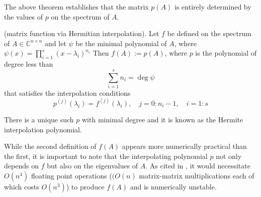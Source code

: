 The above theorem establishes that the matrix $p(A)$ is entirely determined by the values of $p$ on the spectrum of $A$.

\begin{definition}
    \label{def:2.5}
    \cite{8}(matrix function via Hermitian interpolation). Let $f$ be defined on the spectrum of $A \in \mathbb{C}^{n \times n}$ and let $\psi$ be the minimal polynomial of $A$, where $\psi(x)=\prod^{s}_{i=1}(x-\lambda_{i})^{n_{i}}$ Then $f(A) := p(A)$, where $p$ is the polynomial of degree less than
    \[
        \sum_{i=1}^{s} n_i = \deg \psi
    \]
    that satisfies the interpolation conditions
    \begin{equation}
        p^{(j)}(\lambda_i) = f^{(j)}(\lambda_i), \quad j=0:n_i-1, \quad i=1:s
        \label{eq:2.5}
    \end{equation}

    There is a unique such $p$ with minimal degree and it is known as the Hermite interpolation polynomial.
\end{definition}

While the second definition of $f(A)$ appears more numerically practical than the first, it is important to note that the interpolating polynomial $p$ not only depends on $f$ but also on the eigenvalues of $A$. As cited in \cite{15}, it would necessitate $O(n^{4} )$ floating point operations ($(O(n)$ matrix-matrix multiplications each of which costs $O(n^{3} )$) to produce $f(A)$ and is numerically unstable.

